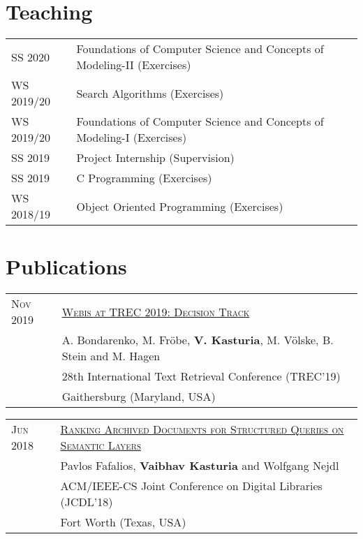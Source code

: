 \documentclass[a4paper,10pt]{article} %
\begin{document}

\section{Teaching}

\begin{tabular}{ll}
\textsc{SS 2020} & Foundations of Computer Science and Concepts of Modeling-II (Exercises)\\
\textsc{WS 2019/20} & Search Algorithms (Exercises)\\
\textsc{WS 2019/20} & Foundations of Computer Science and Concepts of Modeling-I (Exercises)\\
\textsc{SS 2019} & Project Internship (Supervision)\\
\textsc{SS 2019} & C Programming (Exercises)\\
\textsc{WS 2018/19} & Object Oriented Programming (Exercises)\\
\end{tabular}


\section{Publications}

\begin{tabular}{ll}
\textsc{Nov 2019} & \href{https://webis.de/downloads/publications/papers/stein_2019zc.pdf}{\textsc{Webis at TREC 2019: Decision Track}}\\
& A. Bondarenko, M. Fröbe, \textbf{V. Kasturia}, M. Völske, B. Stein and M. Hagen \\
& 28th International Text Retrieval Conference (TREC'19)\\
& Gaithersburg (Maryland, USA)\\
\end{tabular}

\begin{tabular}{ll}
\textsc{Jun 2018} & \href{https://dl.acm.org/doi/10.1145/3197026.3197049}{\textsc{Ranking Archived Documents for Structured Queries on Semantic Layers}}\\
& Pavlos Fafalios, \textbf{Vaibhav Kasturia} and Wolfgang Nejdl\\
& ACM/IEEE-CS Joint Conference on Digital Libraries (JCDL’18)\\
& Fort Worth (Texas, USA)\\
\end{tabular}
\end{document}
